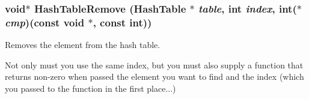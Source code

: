 \subsubsection{\setlength{\rightskip}{0pt plus 5cm}void$\ast$ Hash\-Table\-Remove ({\bf Hash\-Table} $\ast$ {\em table}, int {\em index}, int($\ast$ {\em cmp})(const void $\ast$, const int))}\label{HashTable_8h_a5}


Removes the element from the hash table. 

Not only must you use the same index, but you must also supply a function that returns non-zero when passed the element you want to find and the index (which you passed to the function in the first place...) 